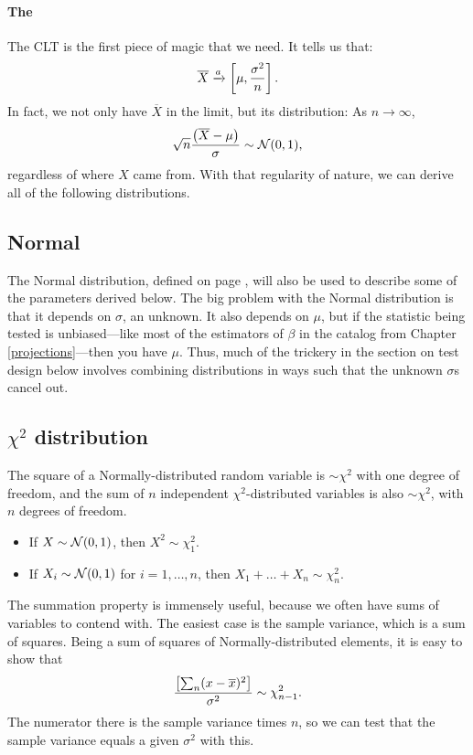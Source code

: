 \paragraph{The } The CLT is the first piece of magic
that we need. It tells us that:
$$\overline X \xrightarrow{a} \left[\mu,{\sigma^2\over n}\right].$$
In fact, we not only have $\overline X$ in the limit, but its distribution:
As $n\to \infty$, $$\sqrt{n} \frac{\left(\overline X - \mu\right)}{\sigma} \sim {\cal N}(0,1),$$ 
regardless of where $X$ came from. With that regularity of nature,
we can derive all of the following distributions.  \label{CLT}

\subsection{Normal} 

The Normal distribution, defined on page \pageref{normal},
will also be used to describe some of the parameters derived below.
The big problem with the Normal distribution is that it depends on $\sigma$, an
unknown. It also depends on $\mu$, but if the statistic
being tested is unbiased---like most of the estimators of $\beta$ in the
catalog from Chapter \ref{projections}---then you have $\mu$. Thus, much of the trickery in the
section on test design below involves combining distributions in ways
such that the unknown $\sigma$s cancel out.

\subsection{$\chi^2$ distribution} 
The square of a Normally-distributed random variable is $\sim \chi^2$
with one degree of freedom, and the sum of $n$ independent
$\chi^2$-distributed variables is also $\sim \chi^2$, with $n$ degrees
of freedom.

\begin{itemize}
\item If $X \sim {\cal N} (0,1)$, then $X^2 \sim \chi^2_1$.

\item If $X_i \sim {\cal N} (0,1)$ for $i=1, \dots, n$, then
$ X_1 + \dots + X_n \sim \chi^2_n$.
\end{itemize}			\label{chisq}

The summation property is immensely useful, because we often have sums
of variables to contend with. The easiest case is the sample variance,
which is a sum of squares. Being a sum of squares of Normally-distributed
elements, it is easy to show that 
\begin{equation}\label{chisqvar}
{\left[\sum_n (x-\overline x)^2\right]\over \sigma^2}\sim \chi^2_{n-1}.
\end{equation}
The numerator there is the sample variance times $n$, so
we can test that the sample variance equals a given $\sigma^2$ with this.

